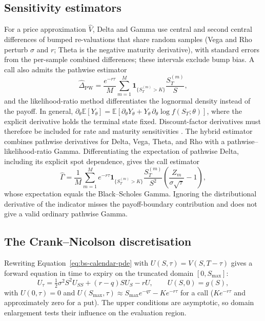 \documentclass[11pt,a4paper]{article}
\begin{document}
\subsection{Sensitivity estimators}

For a price approximation \(\widehat V\), Delta and Gamma use central and
second central differences of bumped re-valuations that share random
samples (Vega and Rho perturb \(\sigma\) and \(r\); Theta is the negative
maturity derivative), with standard errors from the per-sample combined
differences; these intervals exclude bump bias. A call also admits the
pathwise estimator
\begin{equation}
 \widehat\Delta_{\mathrm{PW}}=\frac{e^{-r\tau}}{M}
 \sum_{m=1}^M\mathbf1_{\{S_T^{(m)}>K\}}\frac{S_T^{(m)}}S,
 \label{eq:pathwise-delta}
\end{equation}
and the likelihood-ratio method differentiates the lognormal density
instead of the payoff. In general,
\(\partial_\theta\mathbb E[Y_\theta]=\mathbb E[\partial_\theta Y_\theta+
Y_\theta\,\partial_\theta\log f(S_T;\theta)]\), where the explicit derivative
holds the terminal state fixed. Discount-factor derivatives must therefore
be included for rate and maturity sensitivities \cite{glasserman2004}.
The hybrid estimator combines pathwise derivatives for Delta, Vega,
Theta, and Rho with a pathwise--likelihood-ratio Gamma. Differentiating
the expectation of pathwise Delta, including its explicit spot dependence,
gives the call estimator
\begin{equation}
 \widehat\Gamma=\frac1M\sum_{m=1}^{M}
 e^{-r\tau}\mathbf1_{\{S_T^{(m)}>K\}}
 \frac{S_T^{(m)}}{S^2}\left(\frac{Z_m}{\sigma\sqrt\tau}-1\right),
 \label{eq:hybrid-gamma}
\end{equation}
whose expectation equals the Black--Scholes Gamma. Ignoring the distributional derivative of
the indicator misses the payoff-boundary contribution and does not
give a valid ordinary pathwise Gamma.

\subsection{The Crank--Nicolson discretisation}

Rewriting Equation~\eqref{eq:bs-calendar-pde} with
\(U(S,\tau)=V(S,T-\tau)\) gives a forward equation in time to
expiry on the truncated domain \([0,S_{\max}]\):
\begin{equation}
 U_\tau=\tfrac12\sigma^2S^2U_{SS}+(r-q)SU_S-rU,
 \qquad U(S,0)=g(S),
 \label{eq:pde}
\end{equation}
with \(U(0,\tau)=0\) and \(U(S_{\max},\tau)\approx
S_{\max}e^{-q\tau}-Ke^{-r\tau}\) for a call (\(Ke^{-r\tau}\) and
approximately zero for a put). The upper conditions are asymptotic, so
domain enlargement tests their influence on the evaluation region.
\end{document}
